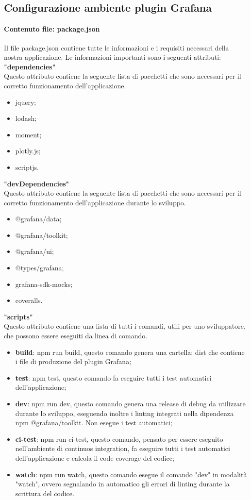 \subsection{Configurazione ambiente plugin Grafana}
\paragraph{Contenuto file: package.json}
Il file package.json contiene tutte le informazioni e i requisiti necessari della nostra applicazione. Le informazioni importanti sono i seguenti attributi:
\textbf{"dependencies"} \\
Questo attributo contiene la seguente lista di pacchetti che sono necessari per il corretto funzionamento dell'applicazione.
\begin{itemize}
	\item jquery;
	\item lodash;
	\item moment;
	\item plotly.js;
	\item scriptjs.
\end{itemize}
\textbf{"devDependencies"} \\
Questo attributo contiene la seguente lista di pacchetti che sono necessari per il corretto funzionamento dell'applicazione durante lo sviluppo.
\begin{itemize}
	\item @grafana/data;
	\item @grafana/toolkit;
	\item @grafana/ui;
	\item @types/grafana;
	\item grafana-sdk-mocks;
	\item coveralls.
\end{itemize}
\textbf{"scripts"} \\
Questo attributo contiene una lista di tutti i comandi, utili per uno sviluppatore, che possono essere eseguiti da linea di comando.
\begin{itemize}
	\item \textbf{build}: npm run build, questo comando genera una cartella: dist che contiene i file di produzione del plugin Grafana\glo;
	\item \textbf{test}: npm test, questo comando fa eseguire tutti i test automatici dell'applicazione;
	\item \textbf{dev}: npm run dev, questo comando genera una release di debug da utilizzare durante lo sviluppo, eseguendo inoltre i linting integrati nella dipendenza npm @grafana/toolkit. Non esegue i test automatici;
	\item \textbf{ci-test}: npm run ci-test, questo comando, pensato per essere eseguito nell'ambiente di continuos integration, fa eseguire tutti i test automatici dell'applicazione e calcola il code coverage del codice;
	\item \textbf{watch}: npm run watch, questo comando esegue il comando "dev" in modalità "watch", ovvero segnalando in automatico gli errori di linting durante la scrittura del codice.
\end{itemize}
